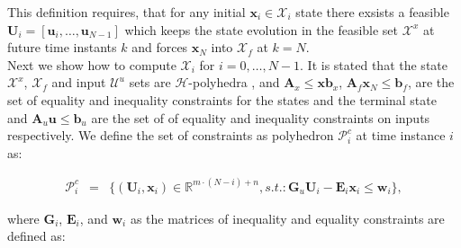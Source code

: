     This definition requires, that for any initial $\textbf{x}_i\in\mathcal{X}_i$ state there exsists a feasible $\textbf{U}_i=[\textbf{u}_i,\dots,\textbf{u}_{N-1}]$ which keeps the state evolution in the feasible set $\mathcal{X}^x$ at future time instants $k$ and forces $\textbf{x}_N$ into $\mathcal{X}_f$ at $k=N$.\\
    Next we show how to compute $\mathcal{X}_i$ for $i=0,\dots,N-1$. It is stated that the state $\mathcal{X}^x$, $\mathcal{X}_f$ and input $\mathcal{U}^u$ sets are $\mathcal{H}$-polyhedra \cite{borrelli2017predictive}, and $\textbf{A}_x\leq\textbf{x}\textbf{b}_x$, $\textbf{A}_f\textbf{x}_N\leq \textbf{b}_f$, are the set of equality and inequality constraints for the states and the terminal state and $\textbf{A}_u\textbf{u}\leq \textbf{b}_u$ are the set of of equality and inequality constraints on inputs respectively. We define the set of constraints as polyhedron $\mathcal{P}^c_i$ at time instance $i$ as:

    \begin{equation}
        \begin{array}{rcl}
            \mathcal{P}^c_i&=&\{
            (\textbf{U}_i,\textbf{x}_i)\in\mathbb{R}^{m\cdot(N-i)+n},s.t.:\textbf{G}_u\textbf{U}_i-\textbf{E}_i\textbf{x}_i\leq\textbf{w}_i
            \},
        \end{array}
        \label{BASICMPC:equ:constrained_constraint_set}
    \end{equation}

    where $\textbf{G}_i$, $\textbf{E}_i$, and $\textbf{w}_i$ as the matrices of inequality and equality constraints are defined as:

